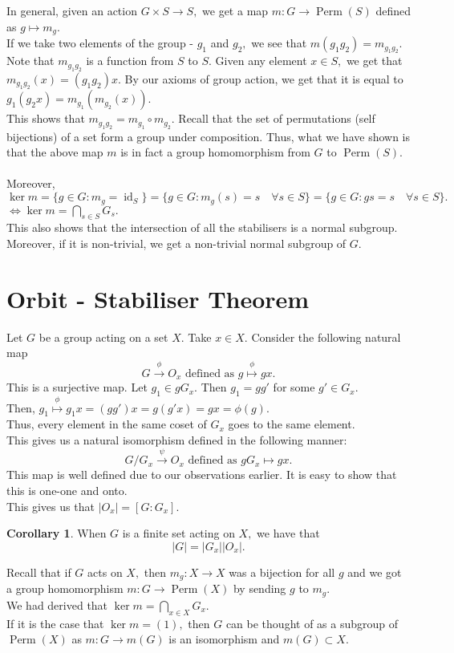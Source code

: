\documentclass[12 pt, a4paper, toc=graduated, oneside]{article}
\theoremstyle{definition}
\newtheorem{cor}{Corollary}
\begin{document}
\hrulefill

In general, given an action $G \times S \to S,$ we get a map $m : G \to \operatorname{Perm}(S)$ defined as $g \mapsto m_g.$\\
If we take two elements of the group - $g_1$ and $g_2,$ we see that $m(g_1g_2) = m_{g_1g_2}.$\\
Note that $m_{g_1g_2}$ is a function from $S$ to $S.$ Given any element $x \in S,$ we get that $m_{g_1g_2}(x) = (g_1g_2)x.$ By our axioms of group action, we get that it is equal to $g_1(g_2 x) = m_{g_1}(m_{g_2}(x)).$\\
This shows that $m_{g_1g_2} = m_{g_1}\circ m_{g_2}.$ Recall that the set of permutations (self bijections) of a set form a group under composition. Thus, what we have shown is that the above map $m$ is in fact a group homomorphism from $G$ to $\operatorname{Perm}(S).$\\~\\
Moreover, $\ker m = \{g \in G : m_g = \operatorname{id}_S\} = \{g \in G : m_g(s) = s \quad \forall s \in S\} = \{g \in G : gs = s \quad \forall s \in S\}.$\\
$\iff \ker m = \displaystyle\bigcap_{s \in S}G_s.$\\
This also shows that the intersection of all the stabilisers is a normal subgroup. Moreover, if it is non-trivial, we get a non-trivial normal subgroup of $G.$

\section{Orbit - Stabiliser Theorem}

Let $G$ be a group acting on a set $X.$ Take $x \in X.$ Consider the following natural map
\[G \overset{\phi}{\longrightarrow}O_x \text{ defined as }g \overset{\phi}{\mapsto}gx.\]
This is a surjective map. Let $g_1 \in gG_x.$ Then $g_1 = gg'$ for some $g' \in G_x.$\\
Then, $g_1 \overset{\phi}{\mapsto}g_1x = (gg')x = g(g'x) = gx = \phi(g).$\\
Thus, every element in the same coset of $G_x$ goes to the same element.\\
This gives us a natural isomorphism defined in the following manner:
\[G/G_x \overset{\psi}{\longrightarrow}O_x \text{ defined as }gG_x \mapsto gx.\]
This map is well defined due to our observations earlier. It is easy to show that this is one-one and onto.\\
This gives us that $|O_x| = [G:G_x].$
\begin{cor}
	When $G$ is a finite set acting on $X,$ we have that
	\[|G| = |G_x||O_x|.\]
\end{cor}
Recall that if $G$ acts on $X,$ then $m_g : X \to X$ was a bijection for all $g$ and we got a group homomorphism $m : G \to \operatorname{Perm}(X)$ by sending $g$ to $m_g.$ \\
We had derived that $\ker m = \displaystyle\bigcap_{x \in X}G_x.$\\
If it is the case that $\ker m = (1),$ then $G$ can be thought of as a subgroup of $\operatorname{Perm}(X)$ as $m:G \to m(G)$ is an isomorphism and $m(G) \subset X.$
\end{document}
